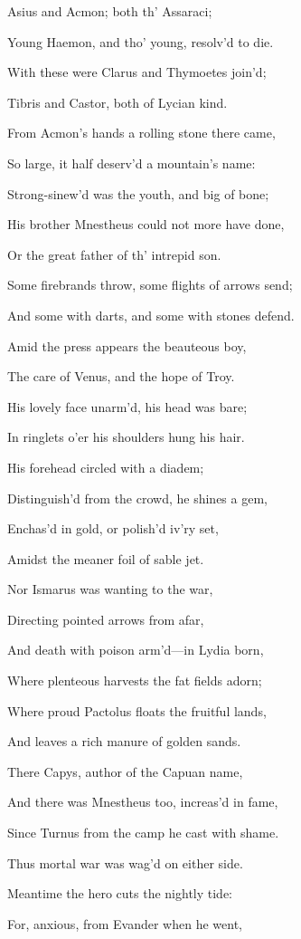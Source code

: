 Asius and Acmon; both th’ Assaraci;

Young Haemon, and tho’ young, resolv’d to die.

With these were Clarus and Thymoetes join’d;

Tibris and Castor, both of Lycian kind.

From Acmon’s hands a rolling stone there came,

So large, it half deserv’d a mountain’s name:

Strong-sinew’d was the youth, and big of bone;

His brother Mnestheus could not more have done,

Or the great father of th’ intrepid son.

Some firebrands throw, some flights of arrows send;

And some with darts, and some with stones defend.

Amid the press appears the beauteous boy,

The care of Venus, and the hope of Troy.

His lovely face unarm’d, his head was bare;

In ringlets o’er his shoulders hung his hair.

His forehead circled with a diadem;

Distinguish’d from the crowd, he shines a gem,

Enchas’d in gold, or polish’d iv’ry set,

Amidst the meaner foil of sable jet.

Nor Ismarus was wanting to the war,

Directing pointed arrows from afar,

And death with poison arm’d—in Lydia born,

Where plenteous harvests the fat fields adorn;

Where proud Pactolus floats the fruitful lands,

And leaves a rich manure of golden sands.

There Capys, author of the Capuan name,

And there was Mnestheus too, increas’d in fame,

Since Turnus from the camp he cast with shame.

Thus mortal war was wag’d on either side.

Meantime the hero cuts the nightly tide:

For, anxious, from Evander when he went,

